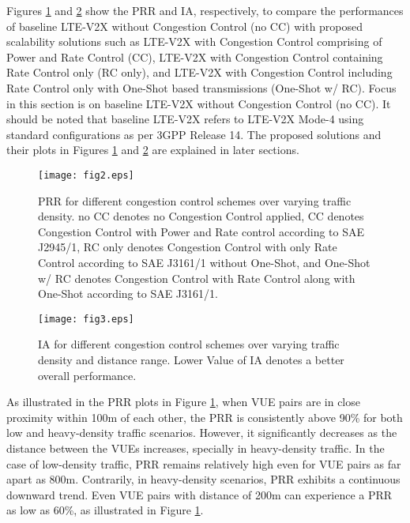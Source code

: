 \documentclass[iicol]{sn-jnl}%
\theoremstyle{thmstyleone}%
\theoremstyle{thmstyletwo}%
\theoremstyle{thmstylethree}%
\begin{document}
Figures \ref{fig:PRR-combined} and \ref{fig:IA-combined} show the PRR and IA, respectively, to compare the performances of baseline LTE-V2X without Congestion Control (no CC) 
with proposed scalability solutions such as
LTE-V2X with Congestion Control comprising of Power and Rate Control (CC), LTE-V2X with Congestion Control containing Rate Control only (RC only), and LTE-V2X with Congestion Control including Rate Control only with One-Shot based transmissions (One-Shot w/ RC). 
Focus in this section is on baseline LTE-V2X without Congestion Control (no CC). It should be noted that baseline LTE-V2X refers to LTE-V2X Mode-4 using standard configurations as per 3GPP Release 14. The proposed solutions and their plots in Figures \mbox{\ref{fig:PRR-combined}} and \mbox{\ref{fig:IA-combined}} are explained in later sections.
\begin{figure}[t]
\centerline{\texttt{[image: fig2.eps]}}
\caption{PRR for different congestion control schemes over varying traffic density. no CC denotes no Congestion Control applied, CC denotes Congestion Control with Power and Rate control according to SAE J2945/1, RC only denotes Congestion Control with only Rate Control according to SAE J3161/1 without One-Shot, and One-Shot w/ RC denotes Congestion Control with Rate Control along with One-Shot according to SAE J3161/1.}
\label{fig:PRR-combined}
\end{figure}
\begin{figure}[t]
\centerline{\texttt{[image: fig3.eps]}}
\caption{IA for different congestion control schemes over varying traffic density and distance range. Lower Value of IA denotes a better overall performance.}
\label{fig:IA-combined}
\end{figure}

As illustrated in the PRR plots in Figure \mbox{\ref{fig:PRR-combined}}, when VUE pairs are in close proximity within 100m of each other, the PRR is consistently above 90\% for both low and heavy-density traffic scenarios. However, it significantly decreases as the distance between the VUEs increases, specially in heavy-density traffic. In the case of low-density traffic, PRR remains relatively high even for VUE pairs as far apart as 800m. Contrarily, in heavy-density scenarios, PRR exhibits a continuous downward trend. Even VUE pairs with distance of 200m can experience a PRR as low as 60\%, as illustrated in Figure \mbox{\ref{fig:PRR-combined}}.
\end{document}
